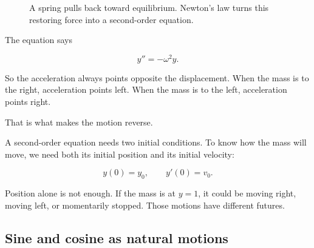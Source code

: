 \begin{figure}[h]
\centering
{}
\caption{A spring pulls back toward equilibrium.  Newton's law turns this restoring force into a second-order equation.}
\label{fig:spring-mass-equation}
\end{figure}

The equation says

\[
y''=-\omega^2y.
\]

So the acceleration always points opposite the displacement.  When the mass is to the
right, acceleration points left.  When the mass is to the left, acceleration points right.

That is what makes the motion reverse.

A second-order equation needs two initial conditions.  To know how the mass will move,
we need both its initial position and its initial velocity:

\[
y(0)=y_0,
\qquad
y'(0)=v_0.
\]

Position alone is not enough.  If the mass is at \(y=1\), it could be moving right, moving
left, or momentarily stopped.  Those motions have different futures.

\subsection{Sine and cosine as natural motions}
\label{subsec:sine-cosine-natural-motions}

